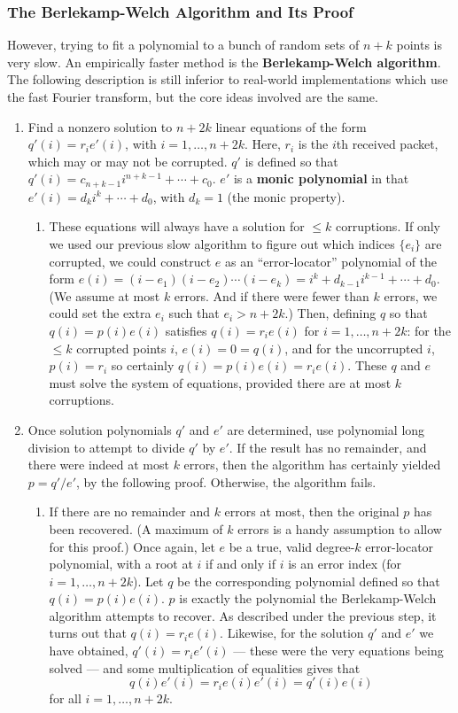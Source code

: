 \documentclass[12pt]{article}
\begin{document}
\subsubsection{The Berlekamp-Welch Algorithm and Its Proof}

However, trying to fit a polynomial to a bunch of random sets of $n + k$ points is very slow. An empirically faster method is the \textbf{Berlekamp-Welch algorithm}. The following description is still inferior to real-world implementations which use the fast Fourier transform, but the core ideas involved are the same.
\begin{enumerate}
\item Find a nonzero solution to $n + 2k$ linear equations of the form $q'(i) = r_i e'(i)$, with $i = 1, \ldots, n + 2k$. Here, $r_i$ is the $i$th received packet, which may or may not be corrupted. $q'$ is defined so that $q'(i) = c_{n + k - 1} i^{n + k - 1} + \cdots + c_0$. $e'$ is a \textbf{monic polynomial} in that $e'(i) = d_k i^k + \cdots + d_0$, with $d_k = 1$ (the monic property).
\begin{enumerate}
\item These equations will always have a solution for $\leq k$ corruptions. If only we used our previous slow algorithm to figure out which indices $\{ e_i \}$ are corrupted, we could construct $e$ as an ``error-locator'' polynomial of the form $e(i) = (i - e_1)(i - e_2) \cdots (i - e_k) = i^k + d_{k - 1} i^{k - 1} + \cdots + d_0$. (We assume at most $k$ errors. And if there were fewer than $k$ errors, we could set the extra $e_i$ such that $e_i > n + 2k$.) Then, defining $q$ so that $q(i) = p(i) e(i)$ satisfies $q(i) = r_i e(i)$ for $i = 1, \ldots, n + 2k$: for the $\leq k$ corrupted points $i$, $e(i) = 0 = q(i)$, and for the uncorrupted $i$, $p(i) = r_i$ so certainly $q(i) = p(i) e(i) = r_i e(i)$. These $q$ and $e$ must solve the system of equations, provided there are at most $k$ corruptions.
\end{enumerate}
\item Once solution polynomials $q'$ and $e'$ are determined, use polynomial long division to attempt to divide $q'$ by $e'$. If the result has no remainder, and there were indeed at most $k$ errors, then the algorithm has certainly yielded $p = q' / e'$, by the following proof. Otherwise, the algorithm fails.
\begin{enumerate}
\item If there are no remainder and $k$ errors at most, then the original $p$ has been recovered. (A maximum of $k$ errors is a handy assumption to allow for this proof.) Once again, let $e$ be a true, valid degree-$k$ error-locator polynomial, with a root at $i$ if and only if $i$ is an error index (for $i = 1, \ldots, n + 2k$). Let $q$ be the corresponding polynomial defined so that $q(i) = p(i) e(i)$. $p$ is exactly the polynomial the Berlekamp-Welch algorithm attempts to recover. As described under the previous step, it turns out that $q(i) = r_i e(i)$. Likewise, for the solution $q'$ and $e'$ we have obtained, $q'(i) = r_i e'(i)$ --- these were the very equations being solved --- and some multiplication of equalities gives that
\[ q(i) e'(i) = r_i e(i) e'(i) = q'(i) e(i) \]
for all $i = 1, \ldots, n + 2k$.


\end{enumerate}
\end{enumerate}
\end{document}
